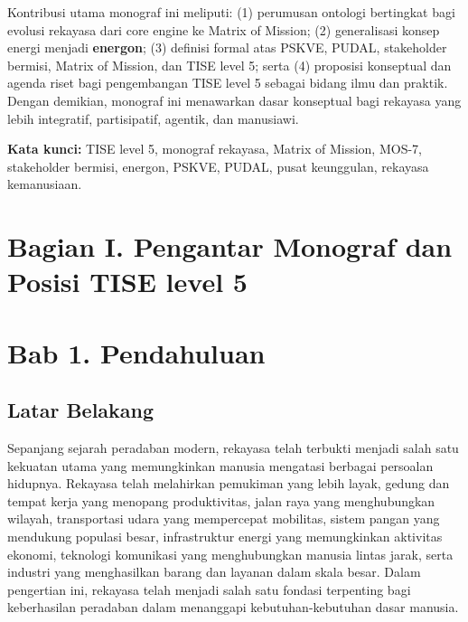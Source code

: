 \documentclass[
  letterpaper,
  DIV=11,
  numbers=noendperiod]{scrreprt}
\begin{document}
Kontribusi utama monograf ini meliputi: (1) perumusan ontologi
bertingkat bagi evolusi rekayasa dari core engine ke Matrix of Mission;
(2) generalisasi konsep energi menjadi \textbf{energon}; (3) definisi
formal atas PSKVE, PUDAL, stakeholder bermisi, Matrix of Mission, dan
TISE level 5; serta (4) proposisi konseptual dan agenda riset bagi
pengembangan TISE level 5 sebagai bidang ilmu dan praktik. Dengan
demikian, monograf ini menawarkan dasar konseptual bagi rekayasa yang
lebih integratif, partisipatif, agentik, dan manusiawi.

\textbf{Kata kunci:} TISE level 5, monograf rekayasa, Matrix of Mission,
MOS-7, stakeholder bermisi, energon, PSKVE, PUDAL, pusat keunggulan,
rekayasa kemanusiaan.


\chapter*{Bagian I. Pengantar Monograf dan Posisi TISE level
5}\label{bagian-i.-pengantar-monograf-dan-posisi-tise-level-5}



\chapter*{Bab 1. Pendahuluan}\label{bab-1.-pendahuluan}


\section*{Latar Belakang}\label{latar-belakang}


Sepanjang sejarah peradaban modern, rekayasa telah terbukti menjadi
salah satu kekuatan utama yang memungkinkan manusia mengatasi berbagai
persoalan hidupnya. Rekayasa telah melahirkan pemukiman yang lebih
layak, gedung dan tempat kerja yang menopang produktivitas, jalan raya
yang menghubungkan wilayah, transportasi udara yang mempercepat
mobilitas, sistem pangan yang mendukung populasi besar, infrastruktur
energi yang memungkinkan aktivitas ekonomi, teknologi komunikasi yang
menghubungkan manusia lintas jarak, serta industri yang menghasilkan
barang dan layanan dalam skala besar. Dalam pengertian ini, rekayasa
telah menjadi salah satu fondasi terpenting bagi keberhasilan peradaban
dalam menanggapi kebutuhan-kebutuhan dasar manusia.
\end{document}
